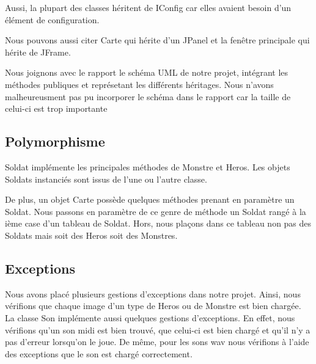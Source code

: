 \documentclass{article}
\begin{document}
  Aussi, la plupart des classes héritent de IConfig car elles avaient besoin d'un élément de configuration. 
  
  Nous pouvons aussi citer Carte qui hérite d'un JPanel et la fenêtre principale qui hérite de JFrame.
  
  Nous joignons avec le rapport le schéma UML de notre projet, intégrant les méthodes publiques et représetant les différents héritages.
  Nous n'avons malheureusment pas pu incorporer le schéma dans le rapport car la taille de celui-ci est trop importante 
  
  \subsection{Polymorphisme}
  Soldat implémente les principales méthodes de Monstre et Heros.
  Les objets Soldats instanciés sont issus de l'une ou l'autre classe.
  
  De plus, un objet Carte possède quelques méthodes prenant en paramètre un Soldat.
  Nous passons en paramètre de ce genre de méthode un Soldat rangé à la ième case d'un tableau de Soldat.
  Hors, nous plaçons dans ce tableau non pas des Soldats mais soit des Heros soit des Monstres.

  \subsection{Exceptions}
  Nous avons placé plusieurs gestions d'exceptions dans notre projet.
  Ainsi, nous vérifions que chaque image d'un type de Heros ou de Monstre est bien chargée.
  La classe Son implémente aussi quelques gestions d'exceptions.
  En effet, nous vérifions qu'un son midi est bien trouvé, que celui-ci est bien chargé et qu'il n'y a pas d'erreur lorsqu'on le joue.
  De même, pour les sons wav nous vérifions à l'aide des exceptions que le son est chargé correctement.
\end{document}

